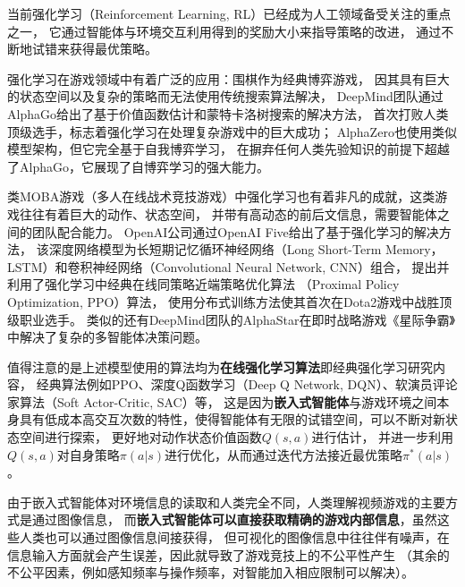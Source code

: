 
当前强化学习（Reinforcement Learning, RL）已经成为人工领域备受关注的重点之一，
它通过智能体与环境交互利用得到的奖励大小来指导策略的改进，
通过不断地试错来获得最优策略。

强化学习在游戏领域中有着广泛的应用：围棋作为经典博弈游戏，
因其具有巨大的状态空间以及复杂的策略而无法使用传统搜索算法解决，
DeepMind团队通过AlphaGo给出了基于价值函数估计和蒙特卡洛树搜索的解决方法，
首次打败人类顶级选手，标志着强化学习在处理复杂游戏中的巨大成功；
AlphaZero也使用类似模型架构，但它完全基于自我博弈学习，
在摒弃任何人类先验知识的前提下超越了AlphaGo，它展现了自博弈学习的强大能力。

类MOBA游戏（多人在线战术竞技游戏）中强化学习也有着非凡的成就，这类游戏往往有着巨大的动作、状态空间，
并带有高动态的前后文信息，需要智能体之间的团队配合能力。
OpenAI公司通过OpenAI Five给出了基于强化学习的解决方法，
该深度网络模型为长短期记忆循环神经网络（Long Short-Term Memory，LSTM）和卷积神经网络（Convolutional Neural Network, CNN）组合，
提出并利用了强化学习中经典在线同策略近端策略优化算法
（Proximal Policy Optimization, PPO）算法，
使用分布式训练方法使其首次在Dota2游戏中战胜顶级职业选手。
类似的还有DeepMind团队的AlphaStar在即时战略游戏《星际争霸》中解决了复杂的多智能体决策问题。


值得注意的是上述模型使用的算法均为\textbf{在线强化学习算法}即经典强化学习研究内容，
经典算法例如PPO、深度Q函数学习（Deep Q Network, DQN）、软演员评论家算法（Soft Actor-Critic, SAC）等，
这是因为\textbf{嵌入式智能体}与游戏环境之间本身具有低成本高交互次数的特性，使得智能体有无限的试错空间，可以不断对新状态空间进行探索，
更好地对动作状态价值函数$Q(s,a)$进行估计，
并进一步利用$Q(s,a)$对自身策略$\pi(a|s)$进行优化，从而通过迭代方法接近最优策略$\pi^*(a|s)$。

由于嵌入式智能体对环境信息的读取和人类完全不同，人类理解视频游戏的主要方式是通过图像信息，
而\textbf{嵌入式智能体可以直接获取精确的游戏内部信息}，虽然这些人类也可以通过图像信息间接获得，
但可视化的图像信息中往往伴有噪声，在信息输入方面就会产生误差，因此就导致了游戏竞技上的不公平性产生
（其余的不公平因素，例如感知频率与操作频率，对智能加入相应限制可以解决）。

